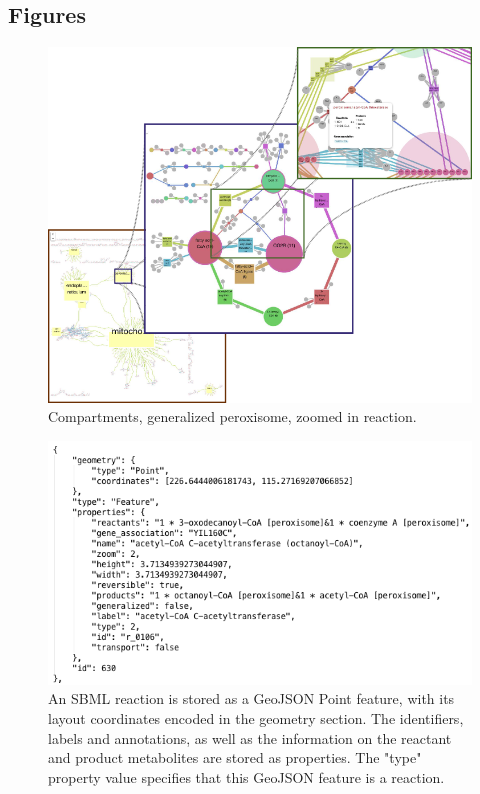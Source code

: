 \documentclass{bmcart}
\begin{document}
\begin{backmatter}

\section*{Figures}
  \begin{figure}[h!]
  \includegraphics[scale=0.5]{figure1.png}
  \caption{
  \label{zoom_levels}
      Compartments, generalized peroxisome, zoomed in reaction.}
      \end{figure}
      
\begin{figure}[h!]
\includegraphics[scale=0.5]{figure2.png}
  \caption{
  \label{geojson}
      An SBML reaction is stored as a GeoJSON Point feature, with its layout coordinates encoded in the geometry section. The identifiers, labels and annotations, as well as the information on the reactant and product metabolites are stored as properties. The "type" property value specifies that this GeoJSON feature is a reaction.}
      \end{figure}
      

\end{backmatter}
\end{document}
